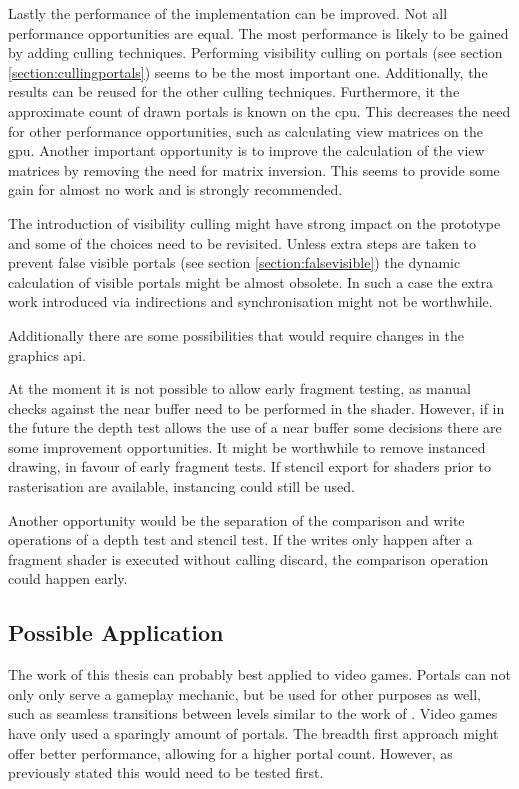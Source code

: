Lastly the performance of the implementation can be improved. Not all performance opportunities are equal. The most performance is likely to be gained by adding culling techniques. Performing visibility culling on portals (see section \ref{section:cullingportals}) seems to be the most important one. Additionally, the results can be reused for the other culling techniques. Furthermore, it the approximate count of drawn portals is known on the \gls{cpu}. This decreases the need for other performance opportunities, such as calculating view matrices on the \gls{gpu}. Another important opportunity is to improve the calculation of the view matrices by removing the need for matrix inversion. This seems to provide some gain for almost no work and is strongly recommended.

The introduction of visibility culling might have strong impact on the prototype and some of the choices need to be revisited. Unless extra steps are taken to prevent false visible portals (see section \ref{section:falsevisible}) the dynamic calculation of visible portals might be almost obsolete. In such a case the extra work introduced via indirections and synchronisation might not be worthwhile.

Additionally there are some possibilities that would require changes in the graphics \gls{api}.

At the moment it is not possible to allow early fragment testing, as manual checks against the near buffer need to be performed in the shader. However, if in the future the depth test allows the use of a near buffer some decisions there are some improvement opportunities. It might be worthwhile to remove instanced drawing, in favour of early fragment tests. If stencil export for shaders prior to rasterisation are available, instancing could still be used.

Another opportunity would be the separation of the comparison and write operations of a depth test and stencil test. If the writes only happen after a fragment shader is executed without calling discard, the comparison operation could happen early.

\subsection{Possible Application}
The work of this thesis can probably best applied to video games. Portals can not only only serve a gameplay mechanic, but be used for other purposes as well, such as seamless transitions between levels similar to the work of \textcite{schmalstieg:1999:sewing}. Video games have only used a sparingly amount of portals. The breadth first approach might offer better performance, allowing for a higher portal count. However, as previously stated this would need to be tested first.

